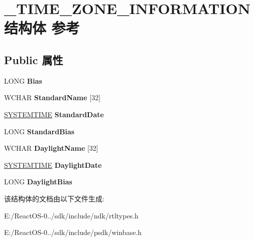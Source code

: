 \hypertarget{struct___t_i_m_e___z_o_n_e___i_n_f_o_r_m_a_t_i_o_n}{}\section{\+\_\+\+T\+I\+M\+E\+\_\+\+Z\+O\+N\+E\+\_\+\+I\+N\+F\+O\+R\+M\+A\+T\+I\+O\+N结构体 参考}
\label{struct___t_i_m_e___z_o_n_e___i_n_f_o_r_m_a_t_i_o_n}
\subsection*{Public 属性}
\begin{DoxyCompactItemize}
\item 
\mbox{\label{struct___t_i_m_e___z_o_n_e___i_n_f_o_r_m_a_t_i_o_n_a57e8a56bab362e92e19e44a2538eae7f}} 
L\+O\+NG {\bfseries Bias}
\item 
\mbox{\label{struct___t_i_m_e___z_o_n_e___i_n_f_o_r_m_a_t_i_o_n_aebd564b18d40e0dddff9ac7f63484ddd}} 
W\+C\+H\+AR {\bfseries Standard\+Name} \mbox{[}32\mbox{]}
\item 
\mbox{\label{struct___t_i_m_e___z_o_n_e___i_n_f_o_r_m_a_t_i_o_n_acd952e000ccfa27a00e1753542220e97}} 
\hyperlink{struct___s_y_s_t_e_m_t_i_m_e}{S\+Y\+S\+T\+E\+M\+T\+I\+ME} {\bfseries Standard\+Date}
\item 
\mbox{\label{struct___t_i_m_e___z_o_n_e___i_n_f_o_r_m_a_t_i_o_n_a802bb93f660a050758ae432b391e93bd}} 
L\+O\+NG {\bfseries Standard\+Bias}
\item 
\mbox{\label{struct___t_i_m_e___z_o_n_e___i_n_f_o_r_m_a_t_i_o_n_a7fb669c3b2886c2a8d52b4d3c9ca1cc5}} 
W\+C\+H\+AR {\bfseries Daylight\+Name} \mbox{[}32\mbox{]}
\item 
\mbox{\label{struct___t_i_m_e___z_o_n_e___i_n_f_o_r_m_a_t_i_o_n_a41012ef0b7ec07d54aa85bb5746d81d0}} 
\hyperlink{struct___s_y_s_t_e_m_t_i_m_e}{S\+Y\+S\+T\+E\+M\+T\+I\+ME} {\bfseries Daylight\+Date}
\item 
\mbox{\label{struct___t_i_m_e___z_o_n_e___i_n_f_o_r_m_a_t_i_o_n_a34be49a025d933ddb6875d3f8c4ba087}} 
L\+O\+NG {\bfseries Daylight\+Bias}
\end{DoxyCompactItemize}


该结构体的文档由以下文件生成\+:\begin{DoxyCompactItemize}
\item 
E\+:/\+React\+O\+S-\/0../sdk/include/ndk/rtltypes.\+h\item 
E\+:/\+React\+O\+S-\/0../sdk/include/psdk/winbase.\+h\end{DoxyCompactItemize}
